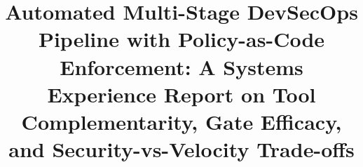 \documentclass[conference]{IEEEtran}
\begin{document}
\title{Automated Multi-Stage DevSecOps Pipeline with Policy-as-Code Enforcement: A Systems Experience Report on Tool Complementarity, Gate Efficacy, and Security-vs-Velocity Trade-offs}

\author{
}

\maketitle

\begin{abstract}

\end{abstract}
\end{document}
